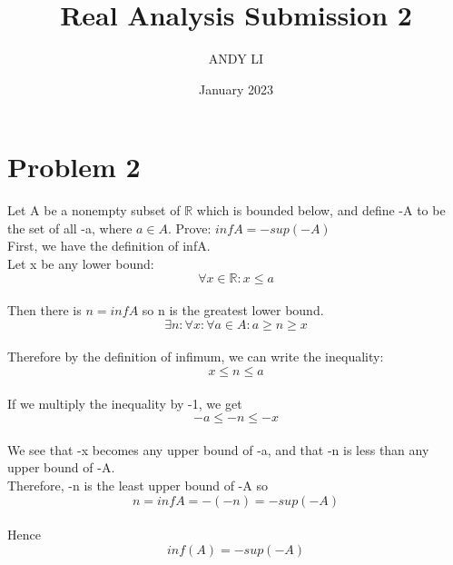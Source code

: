 \documentclass{article}
\title{Real Analysis Submission 2}
\author{ANDY LI}
\date{January 2023}
\begin{document}
\maketitle
\section*{Problem 2}
Let A be a nonempty subset of $\mathbb{R}$ which is bounded below, and define -A to be the set of all -a, where $a \in A$. Prove: $infA = -sup(-A)$
\\First, we have the definition of infA.
\\Let x be any lower bound: $$\forall x \in \mathbb{R} : x \leq a$$
\\Then there is $n = infA$ so n  is the greatest lower bound. $$\exists n : \forall x : \forall a\in A : a \geq n \geq x$$
\\Therefore by the definition of infimum, we can write the inequality: $$x \leq n \leq a$$
\\If we multiply the inequality by -1, we get $$-a \leq -n \leq -x$$
\\We see that -x becomes any upper bound of -a, and that -n is less than any upper bound of -A.
\\Therefore, -n is the least upper bound of -A so $$n = infA = -(-n) = -sup(-A)$$
\\Hence $$inf(A) = -sup(-A)$$
\end{document}
